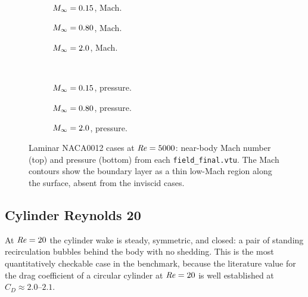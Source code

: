 \begin{figure}[htbp]
  \centering
  \begin{subfigure}{0.32\textwidth}\centering
    \caption{$M_\infty=0.15$, Mach.}
  \end{subfigure}\hfill
  \begin{subfigure}{0.32\textwidth}\centering
    \caption{$M_\infty=0.80$, Mach.}
  \end{subfigure}\hfill
  \begin{subfigure}{0.32\textwidth}\centering
    \caption{$M_\infty=2.0$, Mach.}
  \end{subfigure}\\[6pt]
  \begin{subfigure}{0.32\textwidth}\centering
    \caption{$M_\infty=0.15$, pressure.}
  \end{subfigure}\hfill
  \begin{subfigure}{0.32\textwidth}\centering
    \caption{$M_\infty=0.80$, pressure.}
  \end{subfigure}\hfill
  \begin{subfigure}{0.32\textwidth}\centering
    \caption{$M_\infty=2.0$, pressure.}
  \end{subfigure}
  \caption{Laminar NACA0012 cases at $\mathit{Re}=5000$: near-body Mach number (top)
  and pressure (bottom) from each \texttt{field\_final.vtu}. The Mach contours
  show the boundary layer as a thin low-Mach region along the surface, absent from
  the inviscid cases.}
  \label{fig:naca-lam-field}
\end{figure}

\subsection{Cylinder Reynolds 20}
\label{sec:cyl20}

At $\mathit{Re}=20$ the cylinder wake is steady, symmetric, and closed: a pair of
standing recirculation bubbles behind the body with no shedding. This is the most
quantitatively checkable case in the benchmark, because the literature value for
the drag coefficient of a circular cylinder at $\mathit{Re}=20$ is well established at
$C_D\approx 2.0$--$2.1$.


